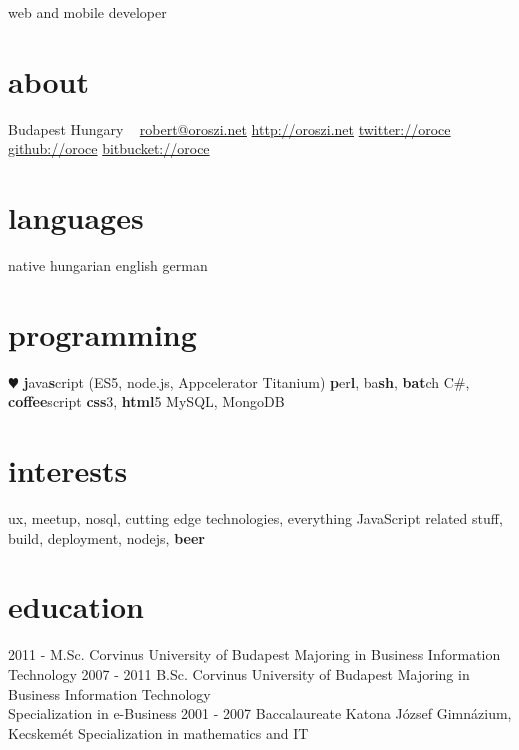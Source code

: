 \documentclass[]{friggeri-cv}
\begin{document}
       {web and mobile developer}

\begin{aside}
  \section{about}
    Budapest
    Hungary
    ~
    \href{mailto:robert@oroszi.net}{robert@oroszi.net}
    \href{http://oroszi.net}{http://oroszi.net}
    \href{http://twitter.com/oroce}{twitter://oroce}
	\href{http://github.com/oroce}{github://oroce}
	\href{http://bitbucket.org/oroce}{bitbucket://oroce}
  \section{languages}
    native hungarian
	english
	german
  \section{programming}
    {\color{red} $\varheartsuit$} \textbf{j}ava\textbf{s}cript
    (ES5, node.js, Appcelerator Titanium)
    \textbf{p}er\textbf{l}, ba\textbf{sh}, \textbf{bat}ch C\#, \textbf{coffee}script
    \textbf{css}3, \textbf{html}5
	MySQL, MongoDB
\end{aside}

\section{interests}

ux, meetup, nosql, cutting edge technologies, everything JavaScript related stuff, build, deployment, nodejs, \textbf{beer}

\section{education}

\begin{entrylist}
  \entry
    {2011 - }
    {M.Sc.}
    {Corvinus University of Budapest}
	{Majoring in Business Information Technology}
  \entry
    {2007 - 2011}
    {B.Sc.}
    {Corvinus University of Budapest}
	{Majoring in Business Information Technology\\
	Specialization in e-Business}
  \entry
    {2001 - 2007}
    {Baccalaureate}
    {Katona József Gimnázium, Kecskemét}
    {Specialization in mathematics and IT}
		
\end{entrylist}
\end{document}
